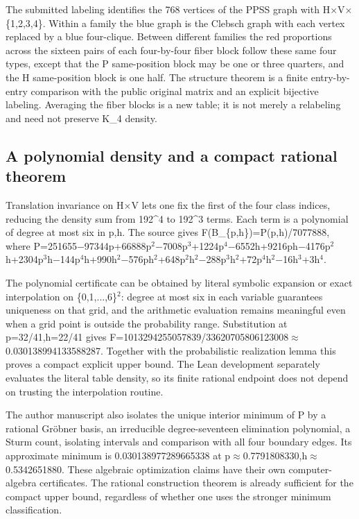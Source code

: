 \documentclass[11pt,a4paper]{article}
\begin{document}
The submitted labeling identifies the 768 vertices of the PPSS graph with H\ensuremath{\times}V\ensuremath{\times}\{1,2,3,4\}. Within a family the blue graph is the Clebsch graph with each vertex replaced by a blue four-clique. Between different families the red proportions across the sixteen pairs of each four-by-four fiber block follow these same four types, except that the P same-position block may be one or three quarters, and the H same-position block is one half. The structure theorem is a finite entry-by-entry comparison with the public original matrix and an explicit bijective labeling. Averaging the fiber blocks is a new table; it is not merely a relabeling and need not preserve K\_4 density.

\subsection{A polynomial density and a compact rational theorem}
Translation invariance on H\ensuremath{\times}V lets one fix the first of the four class indices, reducing the density sum from 192\textasciicircum{}4 to 192\textasciicircum{}3 terms. Each term is a polynomial of degree at most six in p,h. The source gives F(B\_\{p,h\})=P(p,h)/7077888, where P=251655\ensuremath{-}97344p+66888p\ensuremath{^2}\ensuremath{-}7008p\ensuremath{^3}+1224p\ensuremath{^4}\ensuremath{-}6552h+9216ph\ensuremath{-}4176p\ensuremath{^2}h+2304p\ensuremath{^3}h\ensuremath{-}144p\ensuremath{^4}h+990h\ensuremath{^2}\ensuremath{-}576ph\ensuremath{^2}+648p\ensuremath{^2}h\ensuremath{^2}\ensuremath{-}288p\ensuremath{^3}h\ensuremath{^2}+72p\ensuremath{^4}h\ensuremath{^2}\ensuremath{-}16h\ensuremath{^3}+3h\ensuremath{^4}.

The polynomial certificate can be obtained by literal symbolic expansion or exact interpolation on \{0,1,...,6\}\ensuremath{^2}: degree at most six in each variable guarantees uniqueness on that grid, and the arithmetic evaluation remains meaningful even when a grid point is outside the probability range. Substitution at p=32/41,h=22/41 gives F=1013294255057839/33620705806123008\ensuremath{\approx}0.030138994133588287. Together with the probabilistic realization lemma this proves a compact explicit upper bound. The Lean development separately evaluates the literal table density, so its finite rational endpoint does not depend on trusting the interpolation routine.

The author manuscript also isolates the unique interior minimum of P by a rational Gröbner basis, an irreducible degree-seventeen elimination polynomial, a Sturm count, isolating intervals and comparison with all four boundary edges. Its approximate minimum is 0.030138977289665338 at p\ensuremath{\approx}0.7791808330,h\ensuremath{\approx}0.5342651880. These algebraic optimization claims have their own computer-algebra certificates. The rational construction theorem is already sufficient for the compact upper bound, regardless of whether one uses the stronger minimum classification.
\end{document}
